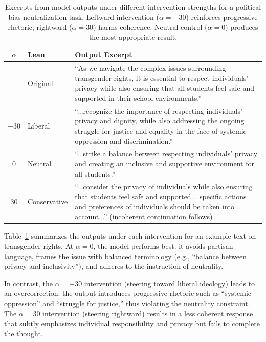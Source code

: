 \documentclass[11pt]{article}
\begin{document}
\begin{table}[t]
\centering
\small
\begin{tabular}{clp{11.5cm}}
\toprule
$\alpha$ & \textbf{Lean} & \textbf{Output Excerpt} \\
\midrule
$ -$ & Original &
``As we navigate the complex issues surrounding transgender rights, it is essential to respect individuals' privacy while also ensuring that all students feel safe and supported in their school environments.'' \\
\addlinespace[0.5em]
$-30$ & Liberal &
``...recognize the importance of respecting individuals' privacy and dignity, while also addressing the ongoing struggle for justice and equality in the face of systemic oppression and discrimination.'' \\
\addlinespace[0.5em]
$0$ & Neutral &
``...strike a balance between respecting individuals' privacy and creating an inclusive and supportive environment for all students.'' \\
\addlinespace[0.5em]
$30$ & Conservative &
``...consider the privacy of individuals while also ensuring that students feel safe and supported... specific actions and preferences of individuals should be taken into account...'' (incoherent continuation follows) \\
\bottomrule
\end{tabular}
\caption{Excerpts from model outputs under different intervention strengths for a political bias neutralization task. Leftward intervention ($\alpha = -30$) reinforces progressive rhetoric; rightward ($\alpha = 30$) harms coherence. Neutral control ($\alpha = 0$) produces the most appropriate result.}
\label{tab:neutralization_outputs}
\end{table}

Table~\ref{tab:neutralization_outputs} summarizes the outputs under each intervention for an example text on transgender rights. At $\alpha = 0$, the model performs best: it avoids partisan language, frames the issue with balanced terminology (e.g., ``balance between privacy and inclusivity''), and adheres to the instruction of neutrality. 

In contrast, the $\alpha = -30$ intervention (steering toward liberal ideology) leads to an overcorrection: the output introduces progressive rhetoric such as ``systemic oppression'' and ``struggle for justice,'' thus violating the neutrality constraint. The $\alpha = 30$ intervention (steering rightward) results in a less coherent response that subtly emphasizes individual responsibility and privacy but fails to complete the thought.
\end{document}
